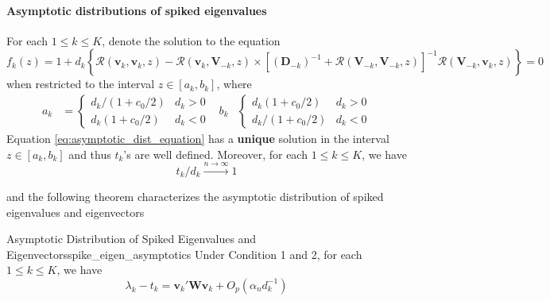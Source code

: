 \documentclass[twoside]{article}
\begin{document}
\paragraph*{Asymptotic distributions of spiked eigenvalues} For each $1\leq k \leq K$, denote the solution to the equation 
\begin{equation}\label{eq:asymptotic_dist_equation}
    f_k(z) = 1 + d_k \left\{ \mathcal{R}(\mathbf{v}_k,\mathbf{v}_k,z)-\mathcal{R}(\mathbf{v}_k,\mathbf{V}_{-k},z) \times \left[(\mathbf{D}_{-k})^{-1}+ \mathcal{R}(\mathbf{V}_{-k},\mathbf{V}_{-k},z)\right]^{-1}\mathcal{R}\left(\mathbf{V}_{-k},\mathbf{v}_k,z\right) \right\} = 0
\end{equation}
when restricted to the interval $z\in \left[a_k,b_k\right]$, where 
\begin{align*}
    a_k &= \begin{cases}
        d_k/(1+c_0/2) & d_k > 0 \\
        d_k(1+c_0/2) & d_k < 0
    \end{cases}
    & b_k & \begin{cases}
        d_k(1+c_0/2) & d_k >0 \\
        d_k/(1+c_0/2) & d_k <0
    \end{cases}
\end{align*}
Equation \ref{eq:asymptotic_dist_equation} has a \textbf{unique} solution in the interval $z\in\left[a_k,b_k\right]$ and thus $t_k$'s are well defined. Moreover, for each $1\leq k \leq K$, we have $$ t_k/d_k \xrightarrow{n\rightarrow\infty} 1 $$

and the following theorem characterizes the asymptotic distribution of spiked eigenvalues and eigenvectors
\begin{theorem}{Asymptotic Distribution of Spiked Eigenvalues and Eigenvectors}{spike_eigen_asymptotics}
    Under Condition 1 and 2, for each $1\leq k \leq K$, we have 
    $$
    \lambda_k - t_k = \mathbf{v}_k'\mathbf{W}\mathbf{v}_k + O_p(\alpha_n d^{-1}_k)
    $$
\end{theorem}

\newpage


\end{document}
